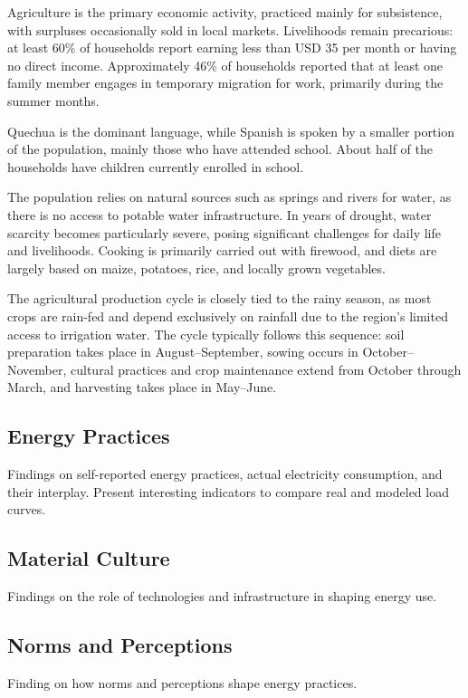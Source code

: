 \documentclass[final,3p,times,onecolumn]{elsarticle}
\begin{document}
Agriculture is the primary economic activity, practiced mainly for subsistence, with surpluses occasionally sold in local markets. Livelihoods remain precarious: at least 60\% of households report earning less than USD 35 per month or having no direct income. Approximately 46\% of households reported that at least one family member engages in temporary migration for work, primarily during the summer months.

Quechua is the dominant language, while Spanish is spoken by a smaller portion of the population, mainly those who have attended school. About half of the households have children currently enrolled in school.

The population relies on natural sources such as springs and rivers for water, as there is no access to potable water infrastructure. In years of drought, water scarcity becomes particularly severe, posing significant challenges for daily life and livelihoods. Cooking is primarily carried out with firewood, and diets are largely based on maize, potatoes, rice, and locally grown vegetables.

The agricultural production cycle is closely tied to the rainy season, as most crops are rain-fed and depend exclusively on rainfall due to the region’s limited access to irrigation water. The cycle typically follows this sequence: soil preparation takes place in August–September, sowing occurs in October–November, cultural practices and crop maintenance extend from October through March, and harvesting takes place in May–June.

\subsection{Energy Practices}
\label{sec:energy_practices}
Findings on self-reported energy practices, actual electricity consumption, and their interplay.
Present interesting indicators to compare real and modeled load curves.

\subsection{Material Culture}
\label{sec:material_culture}
Findings on the role of technologies and infrastructure in shaping energy use.

\subsection{Norms and Perceptions}
\label{sec:norms_perceptions}
Finding on how norms and perceptions shape energy practices. 
\end{document}
